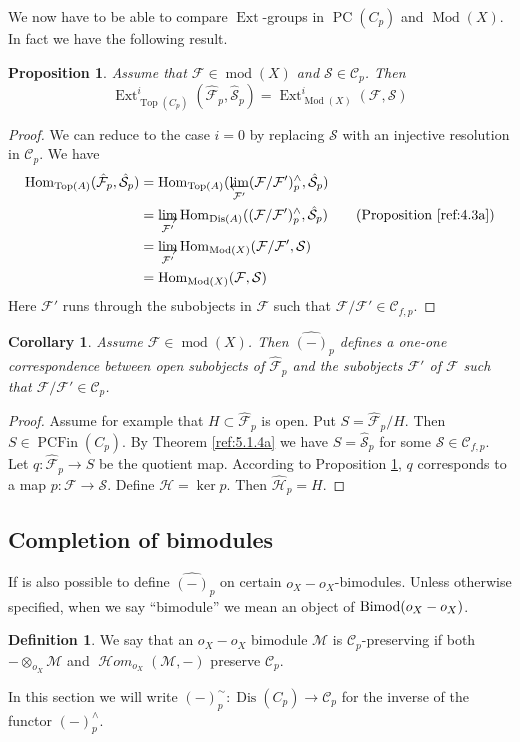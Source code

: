 \documentclass{amsproc}
\def\Cscr{{\mathcal C}}
\def\Fscr{{\mathcal F}}
\def\Hscr{{\mathcal H}}
\def\Mscr{{\mathcal M}}
\def\Sscr{{\mathcal S}}
\DeclareMathOperator{\Dis}{Dis}
\def\HHom{\operatorname {\Hscr \mathit{om}}}
\def\Bimod{\mathop{\text{Bimod}}}
\def\Ext{\operatorname {Ext}}
\def\Hom{\operatorname {Hom}}
\def\HHom{\operatorname {\Hscr \mathit{om}}}
\def\ker{\operatorname {ker}}
\def\coh{\operatorname {mod}}
\def\Qch{\operatorname {Mod}}
\def\r{\rightarrow}
\let\oldtext\text
\def\text#1{\oldtext{\upshape #1}}
\let\invlim\projlim
\DeclareMathOperator{\PC}{PC}
\DeclareMathOperator{\Top}{Top}
\DeclareMathOperator{\PCFin}{PCFin}
\newtheorem{propositions}[lemmas]{Proposition}
\newtheorem{corollarys}[lemmas]{Corollary}
\theoremstyle{definition}
\newtheorem{definitions}[lemmas]{Definition}
\theoremstyle{remark}
\def\dirlim{\mathop{\vtop{\baselineskip -100pt\lineskip -1pt\lineskiplimit 0pt
\setbox0\hbox{\upshape lim}\copy0\hbox to \wd0{\rightarrowfill}}}\limits}
\def\invlim{\mathop{\vtop{\baselineskip -100pt\lineskip -1pt\lineskiplimit 0pt
\setbox0\hbox{\upshape lim}\copy0\hbox to \wd0{\leftarrowfill}}}\limits}
\numberwithin{equation}{section}
\numberwithin{table}{section}
\numberwithin{figure}{section}
\begin{document}
We now have to be able to compare $\Ext$-groups in $\PC(C_p)$ and
$\Qch(X)$. In fact we have the following result.
\begin{propositions}
\label{ref:5.3.4a}
Assume that $\Fscr\in\coh(X)$ and $\Sscr\in \Cscr_{p}$. Then
\[
\Ext_{\Top(C_p)}^i(\hat{\Fscr}_{p},\hat{\Sscr}_{p})=
\Ext_{\Qch(X)}^i(\Fscr,\Sscr)
\]
\end{propositions}
\begin{proof} 
We can reduce to the case $i=0$ by replacing $\Sscr$ with an injective
resolution in $\Cscr_p$.
We have
\begin{align*}
\Hom_{\Top(A)}(\hat{\Fscr}_p,\hat{\Sscr}_p)&=
\Hom_{\Top(A)}(\invlim_{\Fscr'}(\Fscr/\Fscr')_p^\wedge,\hat{\Sscr}_p)\\
&=\dirlim_{\Fscr'}\Hom_{\Dis(A)}((\Fscr/\Fscr')_p^\wedge,\hat{\Sscr}_p)
\qquad \text{(Proposition \ref{ref:4.3a})}\\
&=\dirlim_{\Fscr'} \Hom_{\Qch(X)}(\Fscr/\Fscr',\Sscr)\\
&=\Hom_{\Qch(X)}(\Fscr,\Sscr)
\end{align*}
Here $\Fscr'$ runs through the subobjects in $\Fscr$ such that
$\Fscr/\Fscr'\in\Cscr_{f,p}$.
\end{proof}
\begin{corollarys} 
\label{ref:5.3.5a}
Assume $\Fscr\in\coh(X)$. Then $\hat{(-)}_p$
  defines a one-one correspondence between open subobjects of
  $\hat{\Fscr}_p$ and the subobjects $\Fscr'$ of $\Fscr$ such that
  $\Fscr/\Fscr'\in\Cscr_p$. 
\end{corollarys}
\begin{proof}
  Assume for example that $H\subset \hat{\Fscr}_p$ is open. Put
  $S=\hat{\Fscr}_p/ H$. Then $S\in \PCFin(C_p)$. By Theorem
  \ref{ref:5.1.4a} we have $S=\hat{\Sscr}_p$ for some $\Sscr\in
  \Cscr_{f,p}$.
 Let $q:\hat{\Fscr}_p\r
S$ be the quotient map. According to Proposition \ref{ref:5.3.4a}, $q$
corresponds to a map $p:\Fscr\r \Sscr$. Define $\Hscr=\ker p$. Then
$\hat{\Hscr}_p=H$. 
\end{proof}
 






\subsection{Completion of bimodules}
\label{ref:5.4b}

\leavevmode

If is also possible to define $\hat{(-)}_{p}$ on certain
$o_X-o_X$-bimodules. Unless otherwise specified, when we say ``bimodule''
we mean an object of $\Bimod(o_X-o_X)$.
\begin{definitions} We say that an $o_X-o_X$ bimodule $\Mscr$ is
$\Cscr_{p}$-preserving if both $-\otimes_{o_X}\Mscr$ and
$\HHom_{o_X}(\Mscr,-)$ preserve $\Cscr_{p}$.
\end{definitions}
In this section we will write $(-)^\sim_{p}:\Dis(C_p)\r \Cscr_{p}$
for the inverse of the  functor $(-)^\wedge_{p}$. 
\end{document}
